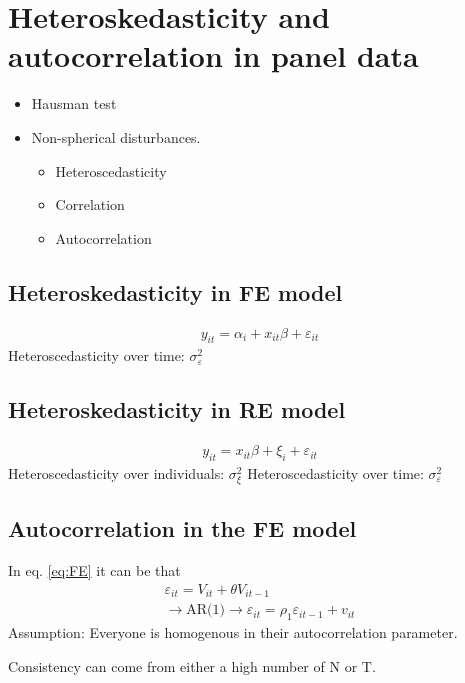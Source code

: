 \section{Heteroskedasticity and autocorrelation in panel data} %
\begin{multicols}{2}
\begin{itemize}
  \item Hausman test
  \item Non-spherical disturbances.
    \begin{itemize}
      \item Heteroscedasticity
      \item Correlation
      \item Autocorrelation
    \end{itemize}
\end{itemize}
\subsection{Heteroskedasticity in FE model}

\begin{align}
  y_{it}= \alpha_i + x_{it}\beta+\varepsilon_{it}
  \label{eq:FE}
\end{align}
Heteroscedasticity over time: $\sigma^2_\varepsilon$\\



\subsection{Heteroskedasticity in RE model}
\begin{align}
  y_{it}=x_{it}\beta+\xi_i+\varepsilon_{it}
  \label{eq:RE}
\end{align}
Heteroscedasticity over individuals: $\sigma^2_\xi$
Heteroscedasticity over time: $\sigma^2_\varepsilon$\\



\subsection{Autocorrelation in the FE model}
In eq. \ref{eq:FE} it can be that
\begin{align*}
  \varepsilon_{it}=V_{it}+\theta V_{it-1}\\
  \rightarrow \textrm{AR(1)} \rightarrow \varepsilon_{it}=\rho_1\varepsilon_{it-1}+v_{it}
\end{align*}
Assumption: Everyone is homogenous in their autocorrelation parameter.\par
Consistency can come from either a high number of N or T.



\end{multicols}
